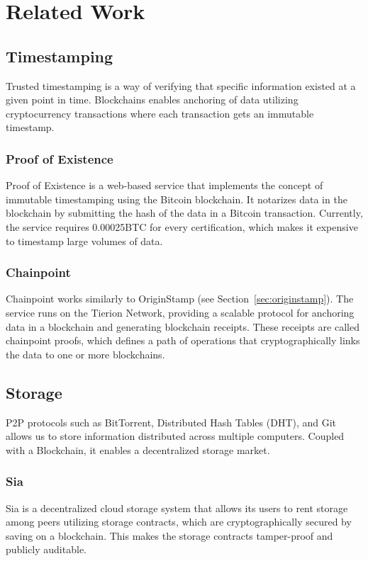 \section{Related Work}
\subsection{Timestamping}
Trusted timestamping is a way of verifying that specific information existed at a given point in time. Blockchains enables anchoring of data utilizing cryptocurrency transactions where each transaction gets an immutable timestamp.

\subsubsection{Proof of Existence}
Proof of Existence\cite{web:poex:1} is a web-based service that implements the concept of immutable timestamping using the Bitcoin blockchain. It notarizes data in the blockchain by submitting the hash of the data in a Bitcoin transaction. Currently, the service requires 0.00025BTC for every certification, which makes it expensive to timestamp large volumes of data.

\subsubsection{Chainpoint}
Chainpoint\cite{web:chainpoint:1} works similarly to OriginStamp (see Section~\ref{sec:originstamp}). The service runs on the Tierion\cite{web:tierion:1} Network, providing a scalable protocol for anchoring data in a blockchain and generating blockchain receipts. These receipts are called chainpoint proofs, which defines a path of operations that cryptographically links the data to one or more blockchains.

\subsection{Storage}
P2P protocols such as BitTorrent\cite{cohen2008bittorrent}, Distributed Hash Tables (DHT), and Git allows us to store information distributed across multiple computers. Coupled with a Blockchain, it enables a decentralized storage market.

\subsubsection{Sia}
Sia\cite{vorick2014sia} is a decentralized cloud storage system that allows its users to rent storage among peers utilizing storage contracts, which are cryptographically secured by saving on a blockchain. This makes the storage contracts tamper-proof and publicly auditable.

